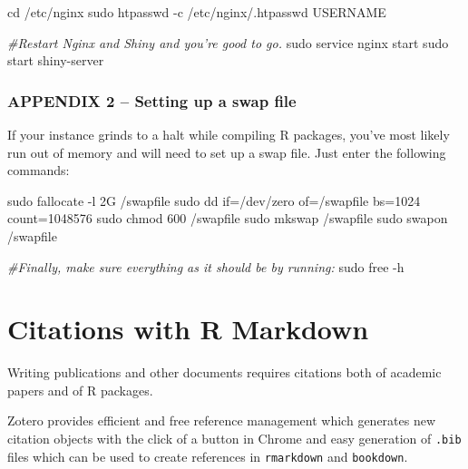 \documentclass[
]{book}
\newenvironment{Shaded}{\begin{snugshade}}{\end{snugshade}}
\newcommand{\BuiltInTok}[1]{#1}
\newcommand{\CommentTok}[1]{\textcolor[rgb]{0.56,0.35,0.01}{\textit{#1}}}
\newcommand{\FunctionTok}[1]{\textcolor[rgb]{0.00,0.00,0.00}{#1}}
\newcommand{\NormalTok}[1]{#1}
\begin{document}
\begin{Shaded}
\begin{Highlighting}[]

\BuiltInTok{cd}\NormalTok{ /etc/nginx}
\FunctionTok{sudo}\NormalTok{ htpasswd -c /etc/nginx/.htpasswd USERNAME}

\CommentTok{#Restart Nginx and Shiny and you’re good to go.}
\FunctionTok{sudo}\NormalTok{ service nginx start}
\FunctionTok{sudo}\NormalTok{ start shiny-server}
\end{Highlighting}
\end{Shaded}

\hypertarget{appendix-2-setting-up-a-swap-file}{%
\subsection{APPENDIX 2 -- Setting up a swap file}\label{appendix-2-setting-up-a-swap-file}}

If your instance grinds to a halt while compiling R packages, you've most likely run out of memory and will need to set up a swap file. Just enter the following commands:

\begin{Shaded}
\begin{Highlighting}[]

\FunctionTok{sudo}\NormalTok{ fallocate -l 2G /swapfile}
\FunctionTok{sudo}\NormalTok{ dd if=/dev/zero of=/swapfile bs=1024 count=1048576}
\FunctionTok{sudo}\NormalTok{ chmod 600 /swapfile}
\FunctionTok{sudo}\NormalTok{ mkswap /swapfile}
\FunctionTok{sudo}\NormalTok{ swapon /swapfile}

\CommentTok{#Finally, make sure everything as it should be by running:}
\FunctionTok{sudo}\NormalTok{ free -h}
\end{Highlighting}
\end{Shaded}

\hypertarget{citations-with-r-markdown}{%
\chapter{Citations with R Markdown}\label{citations-with-r-markdown}}

Writing publications and other documents requires citations both of academic papers and of R packages.

Zotero provides efficient and free reference management which generates new citation objects with the click of a button in Chrome and easy generation of \texttt{.bib} files which can be used to create references in \texttt{rmarkdown} and \texttt{bookdown}.
\end{document}
